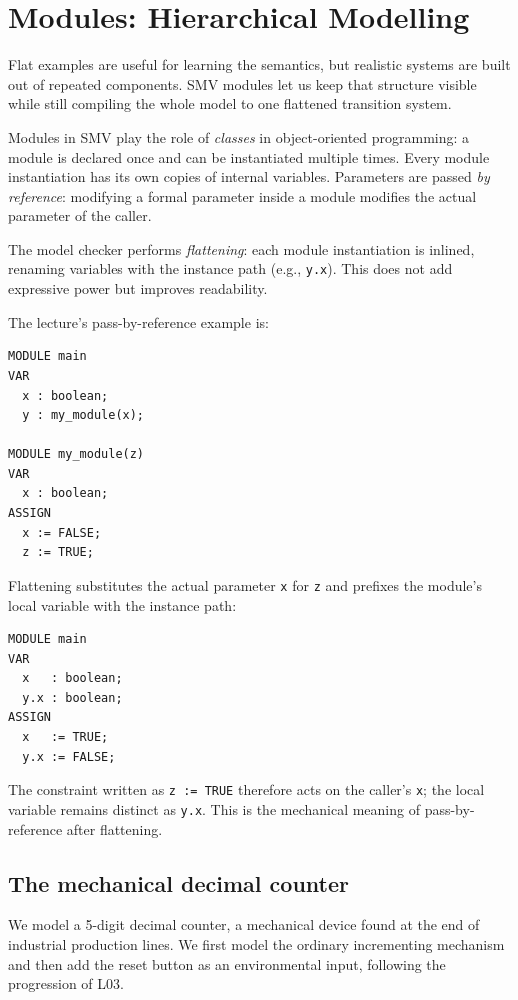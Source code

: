 \section{Modules: Hierarchical Modelling}
\label{sec:smv-modules}

Flat examples are useful for learning the semantics, but realistic systems
are built out of repeated components.  SMV modules let us keep that
structure visible while still compiling the whole model to one flattened
transition system.

Modules in SMV play the role of \emph{classes} in object-oriented
programming: a module is declared once and can be instantiated multiple
times.  Every module instantiation has its own copies of internal variables.
Parameters are passed \emph{by reference}: modifying a formal parameter
inside a module modifies the actual parameter of the caller.

The model checker performs \emph{flattening}: each module instantiation is
inlined, renaming variables with the instance path (e.g.,
\texttt{y.x}).  This does not add expressive power but improves
readability.

\begin{example}
\label{ex:flattening}
The lecture's pass-by-reference example is:
\begin{verbatim}
MODULE main
VAR
  x : boolean;
  y : my_module(x);

MODULE my_module(z)
VAR
  x : boolean;
ASSIGN
  x := FALSE;
  z := TRUE;
\end{verbatim}
Flattening substitutes the actual parameter \texttt{x} for \texttt{z} and
prefixes the module's local variable with the instance path:
\begin{verbatim}
MODULE main
VAR
  x   : boolean;
  y.x : boolean;
ASSIGN
  x   := TRUE;
  y.x := FALSE;
\end{verbatim}
The constraint written as \texttt{z := TRUE} therefore acts on the caller's
\texttt{x}; the local variable remains distinct as \texttt{y.x}.  This is the
mechanical meaning of pass-by-reference after flattening.
\end{example}

\subsection{The mechanical decimal counter}
\label{sec:mech-counter}

We model a 5-digit decimal counter, a mechanical device found at the end
of industrial production lines.  We first model the ordinary incrementing
mechanism and then add the reset button as an environmental input, following
the progression of L03.

